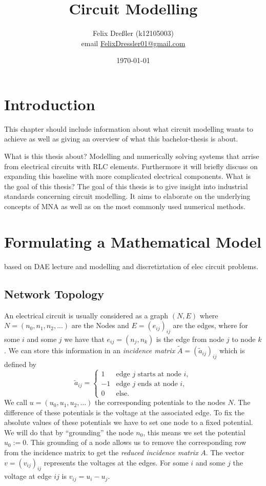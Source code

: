 \documentclass[11pt,titlepage]{article}
\title{Circuit Modelling}
\author{Felix Dreßler (k12105003)\\ email \href{mailto:FelixDressler01@gmail.com}{FelixDressler01@gmail.com}}
\date{\today} %
\begin{document}
	\maketitle
	\section{Introduction}
		This chapter should include information about what circuit modelling wants to achieve as well as giving an overview of what this bachelor-thesis is about.
		
		What is this thesis about? \newline
			Modelling and numerically solving systems that arrise from electrical circuits with RLC elements. Furthermore it will briefly discuss on expanding this baseline with more complicated electrical components.
		What is the goal of this thesis?\newline
			The goal of this thesis is to give insight into industrial standards concerning circuit modelling. It aims to elaborate on the underlying concepts of MNA as well as on the most commonly used numerical methods.
		
	\newpage	
	\section{Formulating a Mathematical Model}
	based on DAE lecture and modelling and discretiztation of elec circuit problems.
		\subsection{Network Topology}
			An electrical circuit is usually considered as a graph $(N,E)$ where $N = (n_0, n_1, n_2, ...)$ are the Nodes and $E = (e_{ij})_{ij}$ are the edges, where for some $i$ and some $j$ we have that $e_{ij} = (n_j, n_k)$ is the edge from node $j$ to node $k$. %
			We can store this information in an \emph{incidence matrix} $\tilde{A} = (\tilde{a}_{ij})_{ij}$ which is defined by
			\begin{displaymath}
				\tilde{a}_{ij} = 
				\begin{cases}
					1 &   \text{edge $j$ starts at node $i$},\\
					-1 &  \text{edge $j$  ends at node $i$},\\
					0 & \text{else}.				
				\end{cases}
			\end{displaymath}
			We call $u = (u_0, u_1, u_2, ...)$ the corresponding potentials to the nodes $N$. The difference of these potentials is the voltage at the associated edge. To fix the absolute values of these potentials we have to set one node to a fixed potential. We will do that by ``grounding'' the node $n_0$, this means we set the potential $u_0 := 0$. This grounding of a node allows us to remove the corresponding row from the incidence matrix to get the \emph{reduced incidence matrix} $A$. The vector $v = (v_{ij})_{ij}$ represents the voltages at the edges. For some $i$ and some $j$ the voltage at edge $ij$ is $v_{ij} = u_i - u_j$.
			
\end{document}
